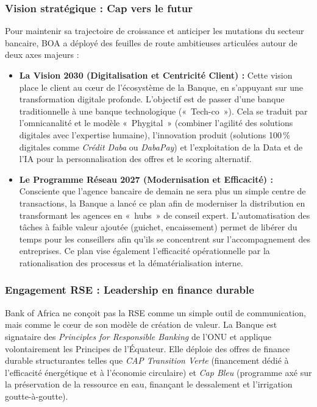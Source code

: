 \documentclass[12pt,a4paper]{report}
\begin{document}
\subsubsection*{Vision stratégique : Cap vers le futur}

Pour maintenir sa trajectoire de croissance et anticiper les mutations du secteur bancaire, BOA a déployé des feuilles de route ambitieuses articulées autour de deux axes majeurs :

\begin{itemize}
  \item \textbf{La Vision 2030 (Digitalisation et Centricité Client) :} Cette vision place le client au c\oe{}ur de l'écosystème de la Banque, en s'appuyant sur une transformation digitale profonde. L'objectif est de passer d'une banque traditionnelle à une banque technologique («~Tech-co~»). Cela se traduit par l'omnicanalité et le modèle «~Phygital~» (combiner l'agilité des solutions digitales avec l'expertise humaine), l'innovation produit (solutions 100\,\% digitales comme \textit{Crédit Daba} ou \textit{DabaPay}) et l'exploitation de la Data et de l'IA pour la personnalisation des offres et le scoring alternatif.

  \item \textbf{Le Programme Réseau 2027 (Modernisation et Efficacité) :} Consciente que l'agence bancaire de demain ne sera plus un simple centre de transactions, la Banque a lancé ce plan afin de moderniser la distribution en transformant les agences en «~hubs~» de conseil expert. L'automatisation des tâches à faible valeur ajoutée (guichet, encaissement) permet de libérer du temps pour les conseillers afin qu'ils se concentrent sur l'accompagnement des entreprises. Ce plan vise également l'efficacité opérationnelle par la rationalisation des processus et la dématérialisation interne.
\end{itemize}

\subsubsection*{Engagement RSE : Leadership en finance durable}

Bank of Africa ne conçoit pas la RSE comme un simple outil de communication, mais comme le c\oe{}ur de son modèle de création de valeur. La Banque est signataire des \textit{Principles for Responsible Banking} de l'ONU et applique volontairement les Principes de l'Équateur. Elle déploie des offres de finance durable structurantes telles que \textit{CAP Transition Verte} (financement dédié à l'efficacité énergétique et à l'économie circulaire) et \textit{Cap Bleu} (programme axé sur la préservation de la ressource en eau, finançant le dessalement et l'irrigation goutte-à-goutte).
\end{document}
